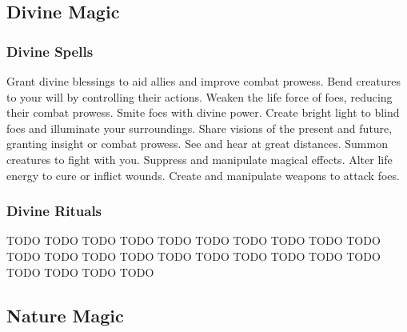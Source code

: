 \small
\subsection{Divine Magic}\label{Divine Magic}
\subsubsection{Divine Spells}\label{Divine Spells}
\begin{spelllist}
 Grant divine blessings to aid allies and improve combat prowess.
 Bend creatures to your will by controlling their actions.
 Weaken the life force of foes, reducing their combat prowess.
 Smite foes with divine power.
 Create bright light to blind foes and illuminate your surroundings.
 Share visions of the present and future, granting insight or combat prowess.
 See and hear at great distances.
 Summon creatures to fight with you.
 Suppress and manipulate magical effects.
 Alter life energy to cure or inflict wounds.
 Create and manipulate weapons to attack foes.
\end{spelllist}
\subsubsection{Divine Rituals}\label{Divine Rituals}
\begin{spelllist}
 TODO
 TODO
 TODO
 TODO
 TODO
 TODO
 TODO
 TODO
 TODO
 TODO
 TODO
 TODO
 TODO
 TODO
 TODO
 TODO
 TODO
 TODO
 TODO
 TODO
 TODO
 TODO
 TODO
 TODO
\end{spelllist}




\small
\subsection{Nature Magic}\label{Nature Magic}
